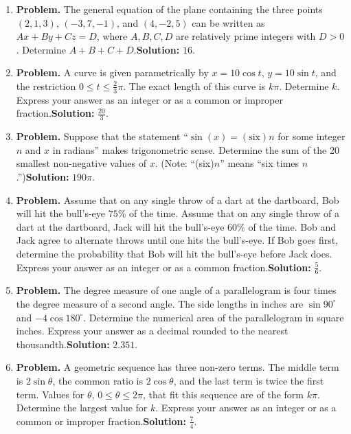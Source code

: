 \documentclass[10pt]{article}
\begin{document}
\begin{enumerate}
  \item \textbf{Problem.} The general equation of the plane containing the three points $(2,1,3)$, $(-3,7,-1)$, and $(4,-2,5)$ can be written as $Ax+By+Cz=D$, where $A,B,C,D$ are relatively prime integers with $D>0$. Determine $A+B+C+D$.\quad \textbf{Solution:} $16$.
  \item \textbf{Problem.} A curve is given parametrically by $x=10\cos t$, $y=10\sin t$, and the restriction $0\leq t\leq\frac23\pi$. The exact length of this curve is $k\pi$. Determine $k$. Express your answer as an integer or as a common or improper fraction.\quad \textbf{Solution:} $\frac{20}{3}$.
  \item \textbf{Problem.} Suppose that the statement ``$\sin(x)=(\text{six})n$ for some integer $n$ and $x$ in radians'' makes trigonometric sense. Determine the sum of the 20 smallest non-negative values of $x$. (Note: ``(six)$n$'' means ``six times $n$.'')\quad \textbf{Solution:} $190\pi$.
  \item \textbf{Problem.} Assume that on any single throw of a dart at the dartboard, Bob will hit the bull's-eye $75\%$ of the time. Assume that on any single throw of a dart at the dartboard, Jack will hit the bull's-eye $60\%$ of the time. Bob and Jack agree to alternate throws until one hits the bull's-eye. If Bob goes first, determine the probability that Bob will hit the bull's-eye before Jack does. Express your answer as an integer or as a common fraction.\quad \textbf{Solution:} $\frac56$.
  \item \textbf{Problem.} The degree measure of one angle of a parallelogram is four times the degree measure of a second angle. The side lengths in inches are $\sin90^\circ$ and $-4\cos180^\circ$. Determine the numerical area of the parallelogram in square inches. Express your answer as a decimal rounded to the nearest thousandth.\quad \textbf{Solution:} $2.351$.
  \item \textbf{Problem.} A geometric sequence has three non-zero terms. The middle term is $2\sin\theta$, the common ratio is $2\cos\theta$, and the last term is twice the first term. Values for $\theta$, $0\leq\theta\leq2\pi$, that fit this sequence are of the form $k\pi$. Determine the largest value for $k$. Express your answer as an integer or as a common or improper fraction.\quad \textbf{Solution:} $\frac74$.
\end{enumerate}

\end{document}

